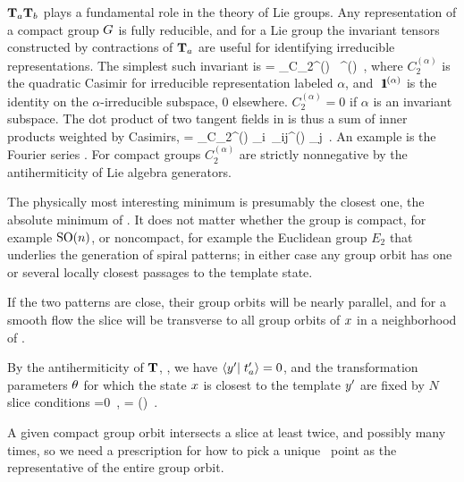 $\mathbf{T}_a \mathbf{T}_b$ plays a fundamental role in the theory of Lie groups.
Any representation of a compact group $G$ is fully
reducible, and for a Lie group
the invariant tensors constructed by contractions
of $\mathbf{T}_a$ are useful for identifying irreducible
representations. The simplest such invariant is
\beq
\dual{\Lg} \cdot \Lg = \sum_\alpha C_2^{(\alpha)} \, \id^{(\alpha)}
\,,
where $C_2^{(\alpha)}$ is the quadratic Casimir for
irreducible representation labeled $\alpha$, and
${\ \hbox{{\rm 1}\kern-.6em\hbox{\rm 1}}}^{(\alpha)}$ is the identity on the $\alpha$-irreducible
subspace, 0 elsewhere. $ C_2^{(\alpha)} =0$ if $\alpha$
is an invariant subspace.
The dot product of two tangent fields in
 is thus a sum of inner products
weighted by Casimirs,
\beq
\braket{\groupTan(\sspRed)}{\groupTan(\slicep)}
   = \sum_\alpha C_2^{(\alpha)} \dual{\sspRed}_i\, \delta_{ij}^{(\alpha)} \slicep_j
\,.
An example is the Fourier series .
For compact groups $C_2^{(\alpha)}$ are strictly nonnegative by
the antihermiticity  of Lie algebra generators.


The physically most interesting minimum is
presumably the closest one, the absolute minimum of .
It does not matter whether the group is compact, for example $\textrm{SO}(n)$, or
noncompact, for example the Euclidean group $E_2$ that underlies the generation
of spiral patterns; in either case any group orbit has
one or several locally closest passages to the template state.







If the two patterns are
close, their group orbits will be nearly parallel, and for a smooth flow
the slice will be transverse to all group orbits of $x$ in a
neighborhood of \slicep.



By the antihermiticity of $\mathbf{T}$, ,  we have
$\braket{\slicep}{\sliceTan{a}}=0$, and the transformation parameters
${\bf \theta}$ for which the state $x$ is closest to the template
${y'}$ are fixed by $N$ slice conditions
\beq
{} =0
    \,,\qquad
\sspRed = \LieEl(\gSpace) \ssp
\,.

A given compact group orbit intersects a slice at least twice, and
possibly many times, so we need a prescription for how to
pick a unique \reducedsp\ point as the representative of the entire group
orbit.


